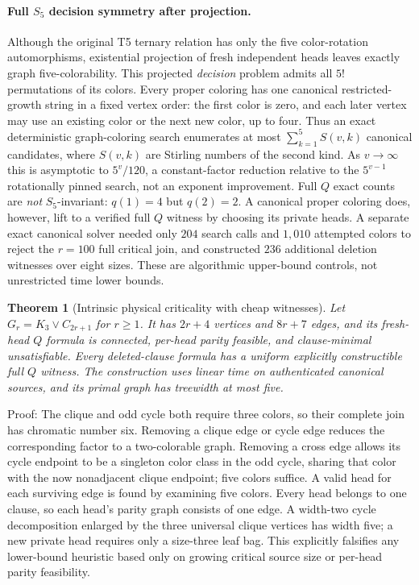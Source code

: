 \documentclass[11pt]{article}
\newtheorem{theorem}{Theorem}
\begin{document}
\paragraph{Full $S_5$ decision symmetry after projection.}
Although the original T5 ternary relation has only the five
color-rotation automorphisms, existential projection of fresh
independent heads leaves exactly graph five-colorability.
This projected \emph{decision} problem admits all $5!$
permutations of its colors. Every proper coloring has one
canonical restricted-growth string in a fixed vertex order:
the first color is zero, and each later vertex may use an
existing color or the next new color, up to four.
Thus an exact deterministic graph-coloring search enumerates
at most $\sum_{k=1}^{5}S(v,k)$ canonical candidates,
where $S(v,k)$ are Stirling numbers of the second kind.
As $v\to\infty$ this is asymptotic to $5^v/120$,
a constant-factor reduction relative to the $5^{v-1}$
rotationally pinned search, not an exponent improvement.
Full $Q$ exact counts are \emph{not} $S_5$-invariant:
$q(1)=4$ but $q(2)=2$. A canonical proper coloring
does, however, lift to a verified full $Q$ witness by
choosing its private heads.
A separate exact canonical solver needed only $204$ search
calls and $1{,}010$ attempted colors to reject the $r=100$
full critical join, and constructed $236$ additional
deletion witnesses over eight sizes. These are algorithmic
upper-bound controls, not unrestricted time lower bounds.

\begin{theorem}[Intrinsic physical criticality with cheap witnesses]
Let $G_r=K_3\vee C_{2r+1}$ for $r\geq1$. It has
$2r+4$ vertices and $8r+7$ edges, and its fresh-head $Q$
formula is connected, per-head parity feasible, and
clause-minimal unsatisfiable. Every deleted-clause formula
has a uniform explicitly constructible full $Q$ witness.
The construction uses linear time on authenticated canonical
sources, and its primal graph has treewidth at most five.
\end{theorem}
\noindent
Proof: The clique and odd cycle both require three colors,
so their complete join has chromatic number six. Removing
a clique edge or cycle edge reduces the corresponding
factor to a two-colorable graph. Removing a cross edge
allows its cycle endpoint to be a singleton color class
in the odd cycle, sharing that color with the now
nonadjacent clique endpoint; five colors suffice.
A valid head for each surviving edge is found by examining
five colors. Every head belongs to one clause, so each
head's parity graph consists of one edge. A width-two cycle
decomposition enlarged by the three universal clique vertices
has width five; a new private head requires only a
size-three leaf bag. This explicitly falsifies any
lower-bound heuristic based only on growing critical source
size or per-head parity feasibility.
\end{document}
